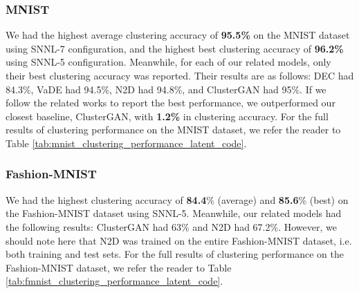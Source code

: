 \documentclass[conference]{IEEEtran}
\begin{document}
\subsubsection{MNIST}
We had the highest average clustering accuracy of \textbf{95.5\%} on the MNIST dataset using SNNL-7 configuration, and the highest best clustering accuracy of \textbf{96.2\%} using SNNL-5 configuration. Meanwhile, for each of our related models, only their best clustering accuracy was reported. Their results are as follows: DEC had 84.3\%, VaDE had 94.5\%, N2D had 94.8\%, and ClusterGAN had 95\%. If we follow the related works to report the best performance, we outperformed our closest baseline, ClusterGAN, with \textbf{1.2\%} in clustering accuracy. For the full results of clustering performance on the MNIST dataset, we refer the reader to Table \ref{tab:mnist_clustering_performance_latent_code}.
\subsubsection{Fashion-MNIST}
We had the highest clustering accuracy of \textbf{84.4}\% (average) and \textbf{85.6}\% (best) on the Fashion-MNIST dataset using SNNL-5. Meanwhile, our related models had the following results: ClusterGAN had 63\% and N2D had 67.2\%. However, we should note here that N2D was trained on the entire Fashion-MNIST dataset, i.e. both training and test sets. For the full results of clustering performance on the Fashion-MNIST dataset, we refer the reader to Table \ref{tab:fmnist_clustering_performance_latent_code}.
\end{document}
